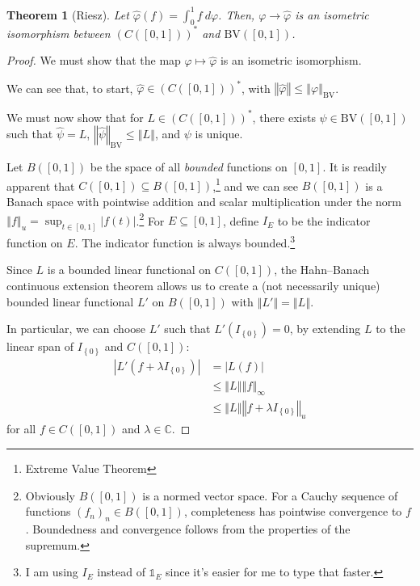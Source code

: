 \documentclass[12pt]{extarticle}
\newcommand{\C}{\mathbb{C}}
\newcommand{\norm}[1]{\left\Vert #1\right\Vert}
\newcommand{\set}[1]{\left\{#1\right\}}
\theoremstyle{plain}
\newtheorem*{theorem}{Theorem}
\theoremstyle{definition}
\theoremstyle{note}
\renewcommand{\newline}{\hfill\break}
\begin{document}
\begin{theorem}[Riesz]
  Let $\hat{\varphi}(f) = \int_{0}^{1}f\:d\varphi$. Then, $\varphi \rightarrow \hat{\varphi}$ is an isometric isomorphism between $\left(C\left([0,1]\right)\right)^{\ast}$ and $\text{BV}\left([0,1]\right)$.
\end{theorem}
\begin{proof}
  We must show that the map $\varphi\mapsto \hat\varphi$ is an isometric isomorphism.\newline

  We can see that, to start, $\hat\varphi \in \left(C\left([0,1]\right)\right)^{\ast}$, with $\norm{\hat{\varphi}} \leq \norm{\varphi}_{\text{BV}}$.\newline

  We must now show that for $L\in \left(C\left([0,1]\right)\right)^{\ast}$, there exists $\psi \in \text{BV}\left([0,1]\right)$ such that $\hat{\psi} = L$, $\norm{\hat{\psi}}_{\text{BV}} \leq \norm{L}$, and $\psi$ is unique.\newline

  Let $B([0,1])$ be the space of all \textit{bounded} functions on $[0,1]$. It is readily apparent that $C([0,1])\subseteq B([0,1])$,\footnote{Extreme Value Theorem} and we can see $B([0,1])$ is a Banach space with pointwise addition and scalar multiplication under the norm $\norm{f}_{u} = \sup_{t\in [0,1]}\left\vert f(t) \right\vert$.\footnote{Obviously $B([0,1])$ is a normed vector space. For a Cauchy sequence of functions $(f_n)_n\in B([0,1])$, completeness has pointwise convergence to $f$. Boundedness and convergence follows from the properties of the supremum.} For $E\subseteq [0,1]$, define $I_{E}$ to be the indicator function on $E$. The indicator function is always bounded.\footnote{I am using $I_E$ instead of $\mathbb{1}_{E}$ since it's easier for me to type that faster.}\newline

  Since $L$ is a bounded linear functional on $C([0,1])$, the Hahn--Banach continuous extension theorem allows us to create a (not necessarily unique) bounded linear functional $L'$ on $B([0,1])$ with $\norm{L'} = \norm{L}$.\newline

  In particular, we can choose $L'$ such that $L'\left(I_{\set{0}}\right) = 0$, by extending $L$ to the linear span of $I_{\set{0}}$ and $C([0,1])$:
  \begin{align*}
    \left\vert L'\left(f + \lambda I_{\set{0}}\right) \right\vert &= \left\vert L(f) \right\vert\\
                                                                  &\leq \norm{L}\norm{f}_{\infty}\\
                                                                  &\leq \norm{L}\norm{f + \lambda I_{\set{0}}}_{u}
  \end{align*}
  for all $f\in C([0,1])$ and $\lambda \in \C$.\newline


\end{proof}
\end{document}
